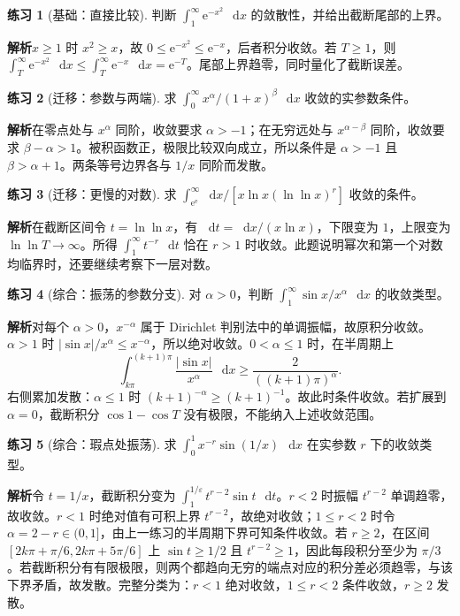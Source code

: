 \documentclass[UTF8,fontset=fandol,12pt,oneside,openany]{ctexrep}
\newcommand{\dd}{\mathop{}\!\mathrm d}
\newcommand{\ee}{\mathrm e}
\theoremstyle{definition}
\newtheorem{exercise}{练习}[chapter]
\begin{document}
\begin{exercise}[基础：直接比较]
判断 $\int_1^\infty\ee^{-x^2}\,\dd x$ 的敛散性，并给出截断尾部的上界。
\end{exercise}
\noindent\textbf{解析}\quad  $x\ge1$ 时 $x^2\ge x$，故 $0\le\ee^{-x^2}\le\ee^{-x}$，后者积分收敛。若 $T\ge1$，则 $\int_T^\infty\ee^{-x^2}\,\dd x\le\int_T^\infty\ee^{-x}\,\dd x=\ee^{-T}$。尾部上界趋零，同时量化了截断误差。

\begin{exercise}[迁移：参数与两端]
求 $\int_0^\infty x^\alpha/(1+x)^\beta\,\dd x$ 收敛的实参数条件。
\end{exercise}
\noindent\textbf{解析}\quad  在零点处与 $x^\alpha$ 同阶，收敛要求 $\alpha>-1$；在无穷远处与 $x^{\alpha-\beta}$ 同阶，收敛要求 $\beta-\alpha>1$。被积函数正，极限比较双向成立，所以条件是 $\alpha>-1$ 且 $\beta>\alpha+1$。两条等号边界各与 $1/x$ 同阶而发散。

\begin{exercise}[迁移：更慢的对数]
求 $\int_{\ee^\ee}^\infty\dd x/[x\ln x(\ln\ln x)^r]$ 收敛的条件。
\end{exercise}
\noindent\textbf{解析}\quad  在截断区间令 $t=\ln\ln x$，有 $\dd t=\dd x/(x\ln x)$，下限变为 $1$，上限变为 $\ln\ln T\to\infty$。所得 $\int_1^\infty t^{-r}\,\dd t$ 恰在 $r>1$ 时收敛。此题说明幂次和第一个对数均临界时，还要继续考察下一层对数。

\begin{exercise}[综合：振荡的参数分支]
对 $\alpha>0$，判断 $\int_1^\infty\sin x/x^\alpha\,\dd x$ 的收敛类型。
\end{exercise}
\noindent\textbf{解析}\quad  对每个 $\alpha>0$，$x^{-\alpha}$ 属于 Dirichlet 判别法中的单调振幅，故原积分收敛。$\alpha>1$ 时 $|\sin x|/x^\alpha\le x^{-\alpha}$，所以绝对收敛。$0<\alpha\le1$ 时，在半周期上
\[
\int_{k\pi}^{(k+1)\pi}\frac{|\sin x|}{x^\alpha}\,\dd x
\ge\frac{2}{((k+1)\pi)^\alpha}.
\]
右侧累加发散：$\alpha\le1$ 时 $(k+1)^{-\alpha}\ge(k+1)^{-1}$。故此时条件收敛。若扩展到 $\alpha=0$，截断积分 $\cos1-\cos T$ 没有极限，不能纳入上述收敛范围。

\begin{exercise}[综合：瑕点处振荡]
求 $\int_0^1 x^{-r}\sin(1/x)\,\dd x$ 在实参数 $r$ 下的收敛类型。
\end{exercise}
\noindent\textbf{解析}\quad  令 $t=1/x$，截断积分变为 $\int_1^{1/\varepsilon}t^{r-2}\sin t\,\dd t$。$r<2$ 时振幅 $t^{r-2}$ 单调趋零，故收敛。$r<1$ 时绝对值有可积上界 $t^{r-2}$，故绝对收敛；$1\le r<2$ 时令 $\alpha=2-r\in(0,1]$，由上一练习的半周期下界可知条件收敛。若 $r\ge2$，在区间 $[2k\pi+\pi/6,2k\pi+5\pi/6]$ 上 $\sin t\ge1/2$ 且 $t^{r-2}\ge1$，因此每段积分至少为 $\pi/3$。若截断积分有有限极限，则两个都趋向无穷的端点对应的积分差必须趋零，与该下界矛盾，故发散。完整分类为：$r<1$ 绝对收敛，$1\le r<2$ 条件收敛，$r\ge2$ 发散。
\end{document}
